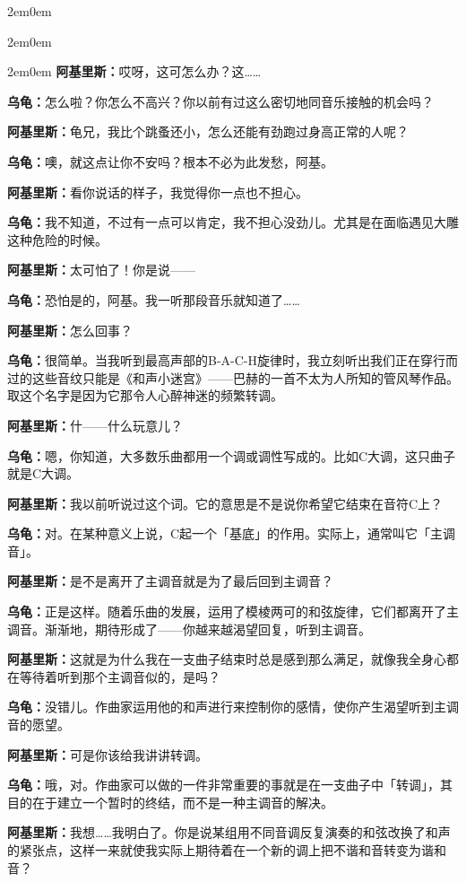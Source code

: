 \documentclass[
  12pt,
  twoside,
  openright,
  oldfontcommands,
]{memoir}
\newcommand{\dialogname}[1]{{\heifamily\bfseries #1}}
\begin{document}
\begin{adjustwidth}{2em}{0em}
\begin{adjustwidth}{2em}{0em}
\begin{adjustwidth}{2em}{0em}
\dialogname{阿基里斯：}哎呀，这可怎么办？这\ldots\ldots{}

\dialogname{乌龟：}怎么啦？你怎么不高兴？你以前有过这么密切地同音乐接触的机会吗？

\dialogname{阿基里斯：}龟兄，我比个跳蚤还小，怎么还能有劲跑过身高正常的人呢？

\dialogname{乌龟：}噢，就这点让你不安吗？根本不必为此发愁，阿基。

\dialogname{阿基里斯：}看你说话的样子，我觉得你一点也不担心。

\dialogname{乌龟：}我不知道，不过有一点可以肯定，我不担心没劲儿。尤其是在面临遇见大雕这种危险的时候。

\dialogname{阿基里斯：}太可怕了！你是说------

\dialogname{乌龟：}恐怕是的，阿基。我一听那段音乐就知道了\ldots\ldots{}

\dialogname{阿基里斯：}怎么回事？

\dialogname{乌龟：}很简单。当我听到最高声部的B-A-C-H旋律时，我立刻听出我们正在穿行而过的这些音纹只能是《和声小迷宫》------巴赫的一首不太为人所知的管风琴作品。取这个名字是因为它那令人心醉神迷的频繁转调。

\dialogname{阿基里斯：}什------什么玩意儿？

\dialogname{乌龟：}嗯，你知道，大多数乐曲都用一个调或调性写成的。比如C大调，这只曲子就是C大调。

\dialogname{阿基里斯：}我以前听说过这个词。它的意思是不是说你希望它结束在音符C上？

\dialogname{乌龟：}对。在某种意义上说，C起一个「基底」的作用。实际上，通常叫它「主调音」。

\dialogname{阿基里斯：}是不是离开了主调音就是为了最后回到主调音？

\dialogname{乌龟：}正是这样。随着乐曲的发展，运用了模棱两可的和弦旋律，它们都离开了主调音。渐渐地，期待形成了------你越来越渴望回复，听到主调音。

\dialogname{阿基里斯：}这就是为什么我在一支曲子结束时总是感到那么满足，就像我全身心都在等待着听到那个主调音似的，是吗？

\dialogname{乌龟：}没错儿。作曲家运用他的和声进行来控制你的感情，使你产生渴望听到主调音的愿望。

\dialogname{阿基里斯：}可是你该给我讲讲转调。

\dialogname{乌龟：}哦，对。作曲家可以做的一件非常重要的事就是在一支曲子中「转调」，其目的在于建立一个暂时的终结，而不是一种主调音的解决。

\dialogname{阿基里斯：}我想\ldots\ldots 我明白了。你是说某组用不同音调反复演奏的和弦改换了和声的紧张点，这样一来就使我实际上期待着在一个新的调上把不谐和音转变为谐和音？


\end{adjustwidth}
\end{adjustwidth}
\end{adjustwidth}
\end{document}
